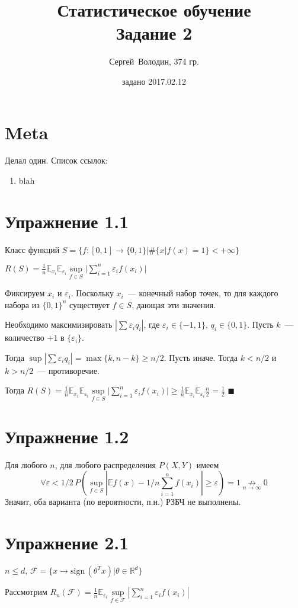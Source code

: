 \documentclass[a4paper]{article}
\title{Статистическое обучение\\Задание 2}
\date{задано 2017.02.12}
\author{Сергей~Володин, 374 гр.}
\newcommand{\sign}{\mbox{sign}\,}
\newcommand{\F}{\mathcal{F}}
\newcommand{\R}{\mathbb{R}}
\newcommand{\E}{\mathbb{E}}
\def\eps{\varepsilon}
\begin{document}
\maketitle
\section*{Meta}
Делал один. Список ссылок:
\begin{enumerate}
\item blah
\end{enumerate}
\section*{Упражнение 1.1}
Класс функций $S=\{f\colon [0,1]\to\{0,1\}\big| \#\{x|f(x)=1\}<+\infty\}$

$R(S)=\frac{1}{n}\mathbb{E}_{x_i}\mathbb{E}_{\eps_i}\sup\limits_{f\in S}\big|\sum\limits_{i=1}^n\eps_if(x_i)\big|$

Фиксируем $x_i$ и $\eps_i$. Поскольку ${x_i}$~--- конечный набор точек, то для каждого набора из $\{0,1\}^n$ существует $f\in S$, дающая эти значения.

Необходимо максимизировать $|\sum \eps_i q_i|$, где $\eps_i\in\{-1,1\}$, $q_i\in\{0,1\}$. Пусть $k$~--- количество $+1$ в $\{\eps_i\}$.

Тогда $\sup|\sum \eps_i q_i|=\max\{k,n-k\}\geqslant n/2$. Пусть иначе. Тогда $k<n/2$ и $k>n/2$~--- противоречие.

Тогда $R(S)=\frac{1}{n}\mathbb{E}_{x_i}\mathbb{E}_{\eps_i}\sup\limits_{f\in S}\big|\sum\limits_{i=1}^n\eps_if(x_i)\big| \geqslant \frac{1}{n}\mathbb{E}_{x_i}\mathbb{E}_{\eps_i}\frac{n}{2}=\frac{1}{2}$ $\blacksquare$
\section*{Упражнение 1.2}
Для любого $n$, для любого распределения $P(X,Y)$ имеем
$$\forall \eps < 1/2\,P(\sup\limits_{f\in S}|\E f(x)-1/n\sum\limits_{i=1}^n f(x_i)|\geqslant\eps)=1\underset{n\to\infty}{\not\to}0$$
Значит, оба варианта (по вероятности, п.н.) РЗБЧ не выполнены.
\section*{Упражнение 2.1}
$n\leqslant d,\,\mathcal{F}=\{x\to \sign(\theta^Tx)\big| \theta\in\R^d\}$

Рассмотрим $R_n(\F)=\frac{1}{n}\mathbb{E}_{\eps_i}\sup\limits_{f\in\F}|\sum\limits_{i=1}^n \eps_i f(x_i)|$
\end{document}
